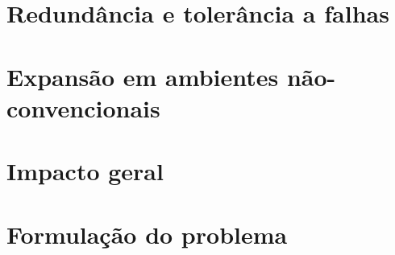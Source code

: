 



\section{Redundância e tolerância a falhas}


\section{Expansão em ambientes não-convencionais}




\section{Impacto geral}


\section{Formulação do problema}



%

%

%











